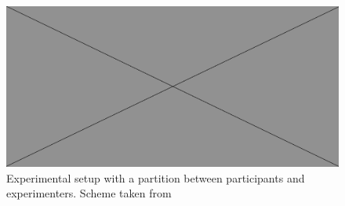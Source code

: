 \begin{figure}[h]
  \centering
  \includegraphics[width=.5\textwidth]{figures/placeholderImg.jpg}
  \caption[Partition setup]{Experimental setup with a partition between participants and experimenters. Scheme taken from \cite{anderson2006visualscanning}}
  \label{fig:partitionsetup}
\end{figure}